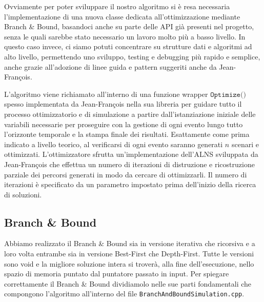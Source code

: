 \documentclass[
    article,            %
    12pt,                %
    oneside,            %
    a4paper,            %
    english,            %
    italian,                %
    sumario=tradicional,
]{abntex2}
\begin{document}
Ovviamente per poter sviluppare il nostro algoritmo si è resa necessaria l'implementazione di una nuova classe dedicata all'ottimizzazione mediante Branch \& Bound, basandoci anche su parte delle API già presenti nel progetto, senza le quali sarebbe stato necessario un lavoro molto più a basso livello. In questo caso invece, ci siamo potuti concentrare su strutture dati e algoritmi ad alto livello, permettendo uno sviluppo, testing e debugging più rapido e semplice, anche grazie all'adozione di linee guida e pattern suggeriti anche da Jean-François.

L'algoritmo viene richiamato all'interno di una funzione wrapper $\texttt{Optimize()}$ spesso implementata da Jean-François nella sua libreria per guidare tutto il processo ottimizzatorio e di simulazione a partire dall'istanziazione iniziale delle variabili necessarie per proseguire con la gestione di ogni evento lungo tutto l'orizzonte temporale e la stampa finale dei risultati. Esattamente come prima indicato a livello teorico, al verificarsi di ogni evento saranno generati $n$ scenari e ottimizzati. L'ottimizzatore sfrutta un'implementazione dell'ALNS \cite{Ropke} sviluppata da Jean-François che effettua un numero di iterazioni di distruzione e ricostruzione parziale dei percorsi generati in modo da cercare di ottimizzarli. Il numero di iterazioni è specificato da un parametro impostato prima dell'inizio della ricerca di soluzioni.

\subsection{Branch \& Bound}
Abbiamo realizzato il Branch \& Bound sia in versione iterativa che ricorsiva e a loro volta entrambe sia in versione Best-First che Depth-First. Tutte le versioni sono void e la migliore soluzione intera si troverà, alla fine dell'esecuzione, nello spazio di memoria puntato dal puntatore passato in input. Per spiegare correttamente il Branch \& Bound dividiamolo nelle sue parti fondamentali che compongono l'algoritmo all'interno del file \texttt{BranchAndBoundSimulation.cpp}.
\end{document}
